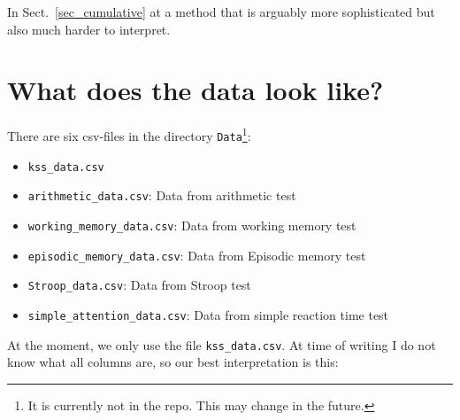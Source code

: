 \documentclass[10pt, twoside,a4paper]{article}
\begin{document}
In Sect.~\ref{sec_cumulative} at a method that is arguably more sophisticated but also much harder to interpret.






\newpage
\section{What does the data look like?}
There are six csv-files in the directory \verb+Data+\footnote{It is currently not in the repo. This may change in the future.}:
\begin{itemize}
\item \verb+kss_data.csv+
\item \verb+arithmetic_data.csv+: Data from arithmetic test
\item \verb+working_memory_data.csv+: Data from working memory test
\item \verb+episodic_memory_data.csv+: Data from Episodic memory test
\item \verb+Stroop_data.csv+: Data from Stroop test
\item \verb+simple_attention_data.csv+: Data from simple reaction time test
\end{itemize}
At the moment, we only use the file \verb+kss_data.csv+. At time of writing I do not know what all columns are, so our best interpretation is this:
\end{document}
